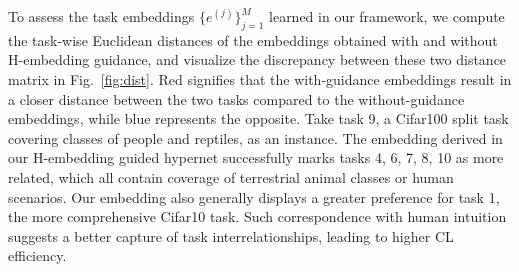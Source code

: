 


To assess the task embeddings $\{e^{(j)}\}_{j=1}^{M}$ learned in our framework, we compute the task-wise Euclidean distances of the embeddings obtained with and without H-embedding guidance, and visualize the discrepancy between these two distance matrix in Fig.~\ref{fig:dist}.  
Red signifies that the with-guidance embeddings result in a closer distance between the two tasks compared to the without-guidance embeddings, while blue represents the opposite.
Take task 9, a Cifar100 split task covering classes of people and reptiles, as an instance. The embedding derived in our H-embedding guided hypernet successfully marks tasks 4, 6, 7, 8, 10 as more related, which all contain coverage of terrestrial animal classes or human scenarios. Our embedding also generally displays a greater preference for task 1, the more comprehensive Cifar10 task. Such correspondence with human intuition suggests a better capture of task interrelationships, leading to higher CL efficiency. 